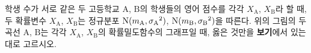 \noindent\begin{minipage}[t]{0.58\linewidth}\vspace{0pt}\raggedright 학생 수가 서로 같은 두 고등학교 $\mathrm{A}$, $\mathrm{B}$의 학생들의 영어 점수를 각각 $X_{\mathrm{A}}$, $X_{\mathrm{B}}$라 할 때, 두 확률변수 $X_{\mathrm{A}}$, $X_{\mathrm{B}}$는 정규분포 $\mathrm{N}(m_{\mathrm{A}}{,}\mkern3mu\mathopen{}{\sigma_{\mathrm{A}}}^2)$, $\mathrm{N}(m_{\mathrm{B}}{,}\mkern3mu\mathopen{}{\sigma_{\mathrm{B}}}^2)$을 따른다. 위의 그림의 두 곡선 $\mathrm{A}$, $\mathrm{B}$는 각각 $X_{\mathrm{A}}$, $X_{\mathrm{B}}$의 확률밀도함수의 그래프일 때, 옳은 것만을 \textbf{보기}에서 있는 대로 고르시오. \end{minipage}\hfill\begin{minipage}[t]{0.4\linewidth}\vspace{0pt}\centering \resizebox{\ifdim\width>\linewidth\linewidth\else\width\fi}{!}{}\end{minipage}\par
\noindent {}
